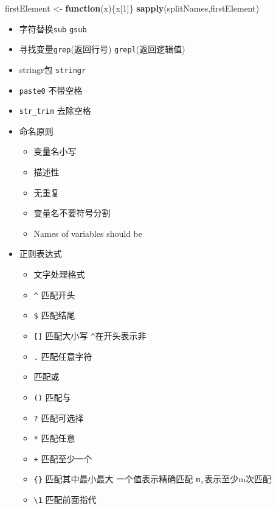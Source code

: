 \documentclass[]{book}
\newenvironment{Shaded}{\begin{snugshade}}{\end{snugshade}}
\newcommand{\ControlFlowTok}[1]{\textcolor[rgb]{0.13,0.29,0.53}{\textbf{#1}}}
\newcommand{\DecValTok}[1]{\textcolor[rgb]{0.00,0.00,0.81}{#1}}
\newcommand{\KeywordTok}[1]{\textcolor[rgb]{0.13,0.29,0.53}{\textbf{#1}}}
\newcommand{\NormalTok}[1]{#1}
\newcommand{\StringTok}[1]{\textcolor[rgb]{0.31,0.60,0.02}{#1}}
\providecommand{\tightlist}{%
  \setlength{\itemsep}{0pt}\setlength{\parskip}{0pt}}
\begin{document}
\begin{Shaded}
\begin{Highlighting}[]
\NormalTok{firstElement <-}\StringTok{ }\ControlFlowTok{function}\NormalTok{(x)\{x[}\DecValTok{1}\NormalTok{]\}}
\KeywordTok{sapply}\NormalTok{(splitNames,firstElement)}
\end{Highlighting}
\end{Shaded}

\begin{itemize}
\tightlist
\item
  字符替换\texttt{sub} \texttt{gsub}
\item
  寻找变量\texttt{grep}(返回行号) \texttt{grepl}(返回逻辑值)
\item
  stringr包 \texttt{stringr}
\item
  \texttt{paste0} 不带空格
\item
  \texttt{str\_trim} 去除空格
\item
  命名原则

  \begin{itemize}
  \tightlist
  \item
    变量名小写
  \item
    描述性
  \item
    无重复
  \item
    变量名不要符号分割
  \item
    Names of variables should be
  \end{itemize}
\item
  正则表达式

  \begin{itemize}
  \tightlist
  \item
    文字处理格式
  \item
    \texttt{\^{}} 匹配开头
  \item
    \texttt{\$} 匹配结尾
  \item
    \texttt{{[}{]}} 匹配大小写 \texttt{\^{}}在开头表示非
  \item
    \texttt{.} 匹配任意字符
  \item
    \texttt{\textbar{}} 匹配或
  \item
    \texttt{()} 匹配与
  \item
    \texttt{?} 匹配可选择
  \item
    \texttt{*} 匹配任意
  \item
    \texttt{+} 匹配至少一个
  \item
    \texttt{\{\}} 匹配其中最小最大 一个值表示精确匹配 \texttt{m,}表示至少m次匹配
  \item
    \texttt{\textbackslash{}1} 匹配前面指代
  \end{itemize}
\end{itemize}
\end{document}
